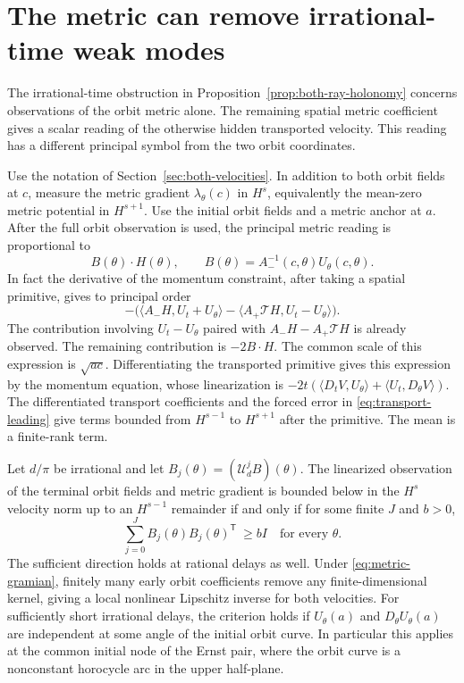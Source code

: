 \section{The metric can remove irrational-time weak modes}
\label{sec:full-metric-holonomy}

The irrational-time obstruction in
Proposition~\ref{prop:both-ray-holonomy}
concerns observations of the orbit metric alone.
The remaining spatial metric coefficient gives
a scalar reading of the otherwise hidden
transported velocity. This reading has a
different principal symbol from the two orbit
coordinates.

Use the notation of Section~\ref{sec:both-velocities}.
In addition to both orbit fields at $c$,
measure the metric gradient $\lambda_\theta(c)$
in $H^s$, equivalently the mean-zero metric
potential in $H^{s+1}$. Use the initial orbit
fields and a metric anchor at $a$.
After the full orbit observation is used,
the principal metric reading is proportional to
\[
 B(\theta)\cdot H(\theta),\qquad
 B(\theta)=A_-^{-1}(c,\theta)U_\theta(c,\theta).
\]
In fact the derivative of the momentum constraint,
after taking a spatial primitive, gives to principal order
\[
 -\Big(\langle A_-H,U_t+U_\theta\rangle
       -\langle A_+\mathcal T H,U_t-U_\theta\rangle\Big).
\]
The contribution involving $U_t-U_\theta$ paired
with $A_-H-A_+\mathcal T H$ is already observed.
The remaining contribution is $-2 B\cdot H$.
The common scale of this expression is $\sqrt{ac}$.
Differentiating the transported primitive gives
this expression by the momentum equation, whose
linearization is
$-2t(\langle D_t V,U_\theta\rangle+
\langle U_t,D_\theta V\rangle)$.
The differentiated transport coefficients and
the forced error in \eqref{eq:transport-leading}
give terms bounded from $H^{s-1}$ to $H^{s+1}$
after the primitive. The mean is a finite-rank term.

\begin{theorem}
\label{th:full-metric-gramian}
Let $d/\pi$ be irrational and let
$B_j(\theta)=(\mathcal U_d^j B)(\theta)$.
The linearized observation of the terminal
orbit fields and metric gradient is bounded below
in the $H^s$ velocity norm up to an
$H^{s-1}$ remainder if and only if
for some finite $J$ and $b>0$,
\begin{equation}
 \sum_{j=0}^J B_j(\theta)B_j(\theta)^\mathsf{T}\ \ge bI
          \quad\text{for every }\theta .
 \label{eq:metric-gramian}
\end{equation}
The sufficient direction holds at rational delays
as well. Under \eqref{eq:metric-gramian},
finitely many early orbit coefficients remove
any finite-dimensional kernel, giving a local
nonlinear Lipschitz inverse for both velocities.
For sufficiently short irrational delays, the
criterion holds if $U_\theta(a)$ and
$D_\theta U_\theta(a)$ are independent at
some angle of the initial orbit curve. In particular
this applies at the common initial node of the
Ernst pair, where the orbit curve is a nonconstant
horocycle arc in the upper half-plane.
\end{theorem}

